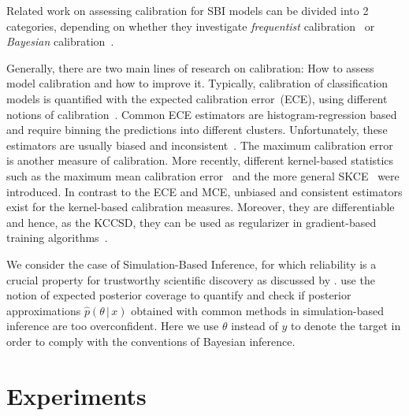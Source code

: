 \documentclass{uai2023} %
\begin{document}
Related work on assessing calibration for SBI models can be divided into 2 categories, depending on whether they investigate \emph{frequentist} calibration~\cite{dalmasso2021likelihood,masserano2022simulation} or \emph{Bayesian} calibration~\cite{delaunoy2022towards,talts2018validating}.

Generally, there are two main lines of research on calibration: How to assess model calibration and how to improve it.
Typically, calibration of classification models is quantified with the expected calibration error~(ECE), using different notions of calibration~\cite{Naeini2015,Kull2019,Guo2017,vaicenavicius2019evaluating,Broecker2007}.
Common ECE estimators are histogram-regression based and require binning the predictions into different clusters.
Unfortunately, these estimators are usually biased and inconsistent~\cite{vaicenavicius2019evaluating}.
The maximum calibration error~\cite{Naeini2015} is another measure of calibration.
More recently, different kernel-based statistics such as the maximum mean calibration error~\cite{kumar18train} and the more general SKCE~\cite{widmann2019calibration,widmann2022calibration} were introduced.
In contrast to the ECE and MCE, unbiased and consistent estimators exist for the kernel-based calibration measures.
Moreover, they are differentiable and hence, as the KCCSD, they can be used as regularizer in gradient-based training algorithms~\cite{kumar18train}.


We consider the case of Simulation-Based Inference, for which reliability is 
a crucial property for trustworthy scientific discovery as discussed by
\citet{Hermans2021,delaunoy2022towards}.
\citet{Hermans2021} use the notion of expected posterior coverage to quantify and check if posterior approximations $\hat{p}(\theta \,|\, x)$ obtained
with common methods in simulation-based inference are too overconfident.
Here we use $ \theta $ instead of $y$ to denote the target in order to comply with the conventions of Bayesian inference.



\section{Experiments}\label{sec:experiments}

\end{document}
